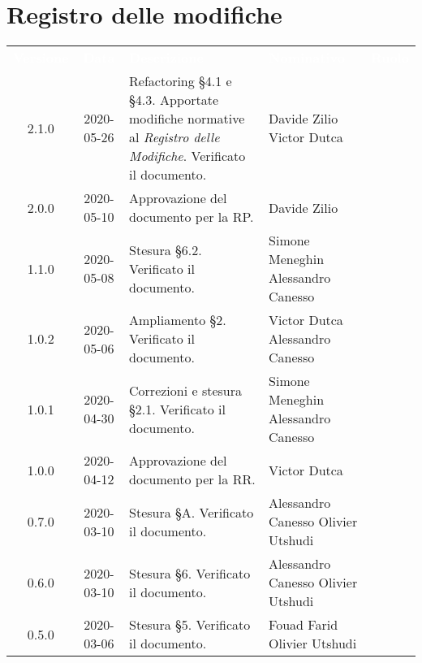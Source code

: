 \section*{Registro delle modifiche}
{
	\centering
	\begin{longtable}{ c c  C{4cm}  C{4cm}  C{3cm} }
		\textcolor{white}{\textbf{Versione}} & \textcolor{white}{\textbf{Data}} & \textcolor{white}{\textbf{Descrizione}} & \textcolor{white}{\textbf{Nominativo}} & \textcolor{white}{\textbf{Ruolo}}\\		
		2.1.0 & 2020-05-26 & Refactoring \S 4.1 e \S 4.3. Apportate modifiche normative al \textit{Registro delle Modifiche}. Verificato il documento. & Davide Zilio \newline Victor Dutca & \adm{} \newline \ver{} \\
		2.0.0 & 2020-05-10 & Approvazione del documento per la RP. & Davide Zilio &\RdP{} \\
		1.1.0 & 2020-05-08 & Stesura \S 6.2. Verificato il documento. & Simone Meneghin \newline Alessandro Canesso &\adm{} \newline \ver{}\\
		1.0.2 & 2020-05-06 & Ampliamento \S 2. Verificato il documento. & Victor Dutca \newline Alessandro Canesso &\Res{} \newline \ver{}\\
		1.0.1 & 2020-04-30 & Correzioni e stesura \S 2.1. Verificato il documento. & Simone Meneghin \newline Alessandro Canesso &\Res{} \newline \ver{}\\
		1.0.0 & 2020-04-12 & Approvazione del documento per la RR. & Victor Dutca &\RdP{} \\
		0.7.0 & 2020-03-10 & Stesura \S A. Verificato il documento. & Alessandro Canesso \newline Olivier Utshudi &\Res{} \newline \ver{}\\
		0.6.0 & 2020-03-10 & Stesura \S 6. Verificato il documento. & Alessandro Canesso \newline Olivier Utshudi &\Res{} \newline \ver{}\\
		0.5.0 & 2020-03-06 & Stesura \S 5. Verificato il documento.  & Fouad Farid \newline Olivier Utshudi &\Res{} \newline \ver{}\\

\end{longtable}}
